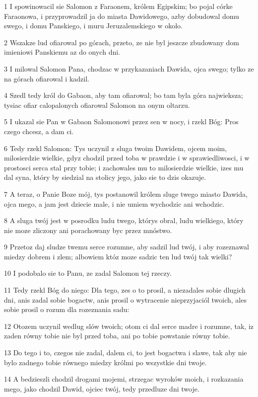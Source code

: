 \par 1 I spowinowacil sie Salomon z Faraonem, królem Egipskim; bo pojal córke Faraonowa, i przyprowadzil ja do miasta Dawidowego, azby dobudowal domu swego, i domu Panskiego, i muru Jeruzalemskiego w okolo.
\par 2 Wszakze lud ofiarowal po górach, przeto, ze nie byl jeszcze zbudowany dom imieniowi Panskiemu az do onych dni.
\par 3 I milowal Salomon Pana, chodzac w przykazaniach Dawida, ojca swego; tylko ze na górach ofiarowal i kadzil.
\par 4 Szedl tedy król do Gabaon, aby tam ofiarowal; bo tam byla góra najwieksza; tysiac ofiar calopalonych ofiarowal Salomon na onym oltarzu.
\par 5 I ukazal sie Pan w Gabaon Salomonowi przez sen w nocy, i rzekl Bóg: Pros czego chcesz, a dam ci.
\par 6 Tedy rzekl Salomon: Tys uczynil z sluga twoim Dawidem, ojcem moim, milosierdzie wielkie, gdyz chodzil przed toba w prawdzie i w sprawiedliwosci, i w prostosci serca stal przy tobie; i zachowales mu to milosierdzie wielkie, izes mu dal syna, który by siedzial na stolicy jego, jako sie to dzis okazuje.
\par 7 A teraz, o Panie Boze mój, tys postanowil królem sluge twego miasto Dawida, ojca mego, a jam jest dziecie male, i nie umiem wychodzic ani wchodzic.
\par 8 A sluga twój jest w posrodku ludu twego, którys obral, ludu wielkiego, który nie moze zliczony ani porachowany byc przez mnóstwo.
\par 9 Przetoz daj sludze twemu serce rozumne, aby sadzil lud twój, i aby rozeznawal miedzy dobrem i zlem; albowiem któz moze sadzic ten lud twój tak wielki?
\par 10 I podobalo sie to Panu, ze zadal Salomon tej rzeczy.
\par 11 Tedy rzekl Bóg do niego: Dla tego, zes o to prosil, a niezadales sobie dlugich dni, anis zadal sobie bogactw, anis prosil o wytracenie nieprzyjaciól twoich, ales sobie prosil o rozum dla rozeznania sadu:
\par 12 Otozem uczynil wedlug slów twoich; otom ci dal serce madre i rozumne, tak, iz zaden równy tobie nie byl przed toba, ani po tobie powstanie równy tobie.
\par 13 Do tego i to, czegos nie zadal, dalem ci, to jest bogactwa i slawe, tak aby nie bylo zadnego tobie równego miedzy królmi po wszystkie dni twoje.
\par 14 A bedzieszli chodzil drogami mojemi, strzegac wyroków moich, i rozkazania mego, jako chodzil Dawid, ojciec twój, tedy przedluze dni twoje.
